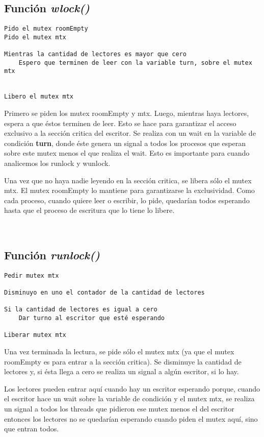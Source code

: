 \newpage

\subsection{Función \textit{wlock()}}

\begin{lstlisting}
Pido el mutex roomEmpty
Pido el mutex mtx

Mientras la cantidad de lectores es mayor que cero
	Espero que terminen de leer con la variable turn, sobre el mutex mtx


Libero el mutex mtx
\end{lstlisting}

Primero se piden los mutex roomEmpty y mtx.
Luego, mientras haya lectores, espera a que éstos terminen de leer. Esto se hace para garantizar el acceso exclusivo a la sección critica del escritor. Se realiza con un wait en la variable de condición \textbf{turn}, donde éste genera un signal a todos los procesos que esperan sobre este mutex menos el que realiza el wait. Esto es importante para cuando analicemos los runlock y wunlock.

Una vez que no haya nadie leyendo en la sección critica, se libera sólo el mutex mtx.
El mutex roomEmpty lo mantiene para garantizarse la exclusividad. Como cada proceso, cuando quiere leer o escribir, lo pide, quedarían todos esperando hasta que el proceso de escritura que lo tiene lo libere.

~
\subsection{Función \textit{runlock()}}

\begin{lstlisting}
Pedir mutex mtx

Disminuyo en uno el contador de la cantidad de lectores

Si la cantidad de lectores es igual a cero
	Dar turno al escritor que esté esperando

Liberar mutex mtx
\end{lstlisting}

Una vez terminada la lectura, se pide sólo el mutex mtx (ya que el mutex roomEmpty es para entrar a la sección critica). Se disminuye la cantidad de lectores y, si ésta llega a cero se realiza un signal a algún escritor, si lo hay.

Los lectores pueden entrar aquí cuando hay un escritor esperando porque, cuando el escritor hace un wait sobre la variable de condición y el mutex mtx, se realiza un signal a todos los threads que pidieron ese mutex menos el del escritor entonces los lectores no se quedarían esperando cuando piden el mutex aquí, sino que entran todos.

